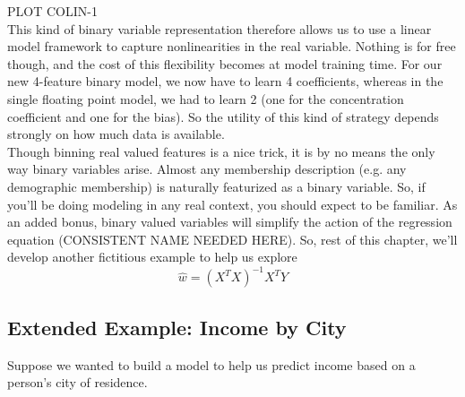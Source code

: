 PLOT COLIN-1\\

This kind of binary variable representation therefore allows us to use a linear
model framework to capture nonlinearities in the real variable.  Nothing is for
free though, and the cost of this flexibility becomes at model training time.
For our new 4-feature binary model, we now have to learn 4 coefficients, whereas
in the single floating point model, we had to learn 2 (one for the concentration
coefficient and one for the bias).  So the utility of this kind of strategy
depends strongly on how much data is available.  \\

Though binning real valued features is a nice trick, it is by no means the only
way binary variables arise.  Almost any membership description (e.g. any
demographic membership) is naturally featurized as a binary variable.  So, if
you'll be doing modeling in any real context, you should expect to be familiar.
As an added bonus, binary valued variables will simplify the action of the
regression equation (CONSISTENT NAME NEEDED HERE).  So, rest of this chapter,
we'll develop another fictitious example to help us explore 
\begin{equation} \hat{w} = (X^T X)^{-1} X^T Y \end{equation}

\subsection{Extended Example: Income by City}

Suppose we wanted to build a model to help us predict income based on a person's
city of residence.  



